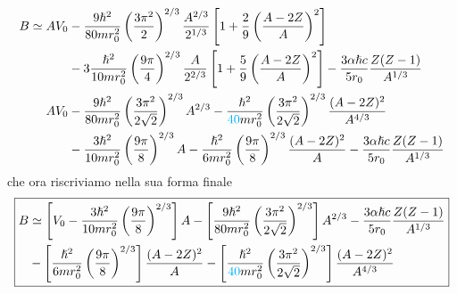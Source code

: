 \begin{align*}
	B \simeq A V_{0} &- \frac{9\hslash^{2}}{80 mr_{0}^{2}}\left( \frac{3\pi^{2}}{2} \right)^{2/3} \frac{A^{2/3}}{2^{1/3}}  \left[ 1+ \frac{2}{9} \left( \frac{A-2Z}{A} \right)^{2} \right] \\
	&- 3 \frac{\hslash^{2}}{10 m r_{0}^{2}} \left( \frac{9\pi}{4} \right)^{2/3} \frac{A}{2^{2/3}}  \left[ 1 + \frac{5}{9} \left( \frac{A-2Z}{A} \right)^{2} \right] - \frac{3 \alpha \hslash c}{5 r_{0}} \frac{Z(Z-1)}{A^{1/3}} \\
	AV_{0} &- \frac{9\hslash^{2}}{80mr_{0}^{2}} \left( \frac{3\pi^{2}}{2\sqrt{ 2 }} \right)^{2/3} A^{2/3} - \frac{\hslash^{2}}{\textcolor{cyan}{40} m r_{0}^{2}} \left( \frac{3\pi^{2}}{2\sqrt{ 2 }} \right)^{2/3} \frac{(A-2Z)^{2}}{A^{4/3}} \\
	&- \frac{3\hslash^{2}}{10mr_{0}^{2}} \left( \frac{9\pi}{8} \right)^{2/3}A - \frac{\hslash^{2}}{6mr_{0}^{2}} \left( \frac{9\pi}{8} \right)^{2/3} \frac{(A-2Z)^{2}}{A} - \frac{3 \alpha \hslash c}{5 r_{0}} \frac{Z(Z-1)}{A^{1/3}}
\end{align*}
che ora riscriviamo nella sua forma finale
\begin{equation}
	\boxed{
	\begin{aligned}
		B &\simeq \left[ V_{0} - \frac{3\hslash^{2}}{10mr_{0}^{2}} \left( \frac{9\pi}{8} \right)^{2/3} \right] A - \left[ \frac{9\hslash^{2}}{80mr_{0}^{2}} \left( \frac{3\pi^{2}}{2\sqrt{ 2 }} \right)^{2/3} \right]A^{2/3}
		- \frac{3 \alpha \hslash c}{5 r_{0}} \frac{Z(Z-1)}{A^{1/3}}  \\
		&- \left[ \frac{\hslash^{2}}{6mr_{0}^{2}} \left( \frac{9\pi}{8} \right)^{2/3}  \right]\frac{(A-2Z)^{2}}{A}
		- \left[ \frac{\hslash^{2}}{\textcolor{cyan}{40} m r_{0}^{2}} \left( \frac{3\pi^{2}}{2\sqrt{ 2 }} \right)^{2/3} \right] \frac{(A-2Z)^{2}}{A^{4/3}}
	\end{aligned}
	}
	\label{eq:binding-energy-expression-fermi-gas-model}
\end{equation}



